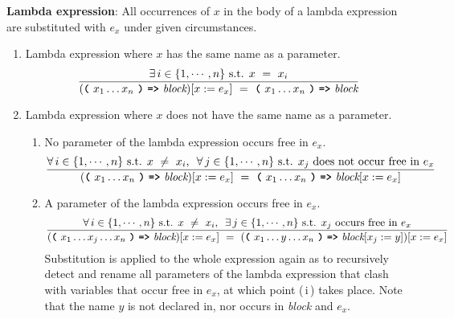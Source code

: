 \vspace{10mm}
\textbf{Lambda expression}: All occurrences of $x$ in the body of a lambda expression are substituted with $e_x$ under given circumstances.
\begin{enumerate}
    \item Lambda expression where $x$ has the same name as a parameter.
    \[
    \frac{
      \exists \, i \in \{1, \cdots, n\} \text{ s.t. } x \ = \ x_i
    }{
      (\textbf{\texttt{(}}\ x_1 \ldots x_n \ \textbf{\texttt{)}}\ \textbf{\texttt{=>}}\ \textit{block})[x := e_x]
      \ = \ 
      \textbf{\texttt{(}}\ x_1 \ldots x_n \ \textbf{\texttt{)}}\ \textbf{\texttt{=>}}\ \textit{block}
    }
    \]
    \item Lambda expression where $x$ does not have the same name as a parameter.
    \begin{enumerate}
        \item No parameter of the lambda expression occurs free in $e_x$.
        \[
        \frac{
          \forall \, i \in \{1, \cdots, n\} \text{ s.t. } x \ \neq \ x_i \text{, } \ \forall \, j \in \{1, \cdots, n\} \text{ s.t. } x_j \text{ does not occur free in $e_x$}
        }{
          (\textbf{\texttt{(}}\ x_1 \ldots x_n \ \textbf{\texttt{)}}\ \textbf{\texttt{=>}}\ \textit{block})[x := e_x]
          \ = \ 
          \textbf{\texttt{(}}\ x_1 \ldots x_n \ \textbf{\texttt{)}}\ \textbf{\texttt{=>}}\ \textit{block}[x := e_x]
        }
        \]
        \item A parameter of the lambda expression occurs free in $e_x$.
        \[
        \frac{
          \forall \, i \in \{1, \cdots, n\} \text{ s.t. } x \ \neq \ x_i \text{, } \ \exists \, j \in \{1, \cdots, n\} \text{ s.t. } x_j \text{ occurs free in $e_x$}
        }{
          (\textbf{\texttt{(}}\ x_1 \ldots x_j \ldots x_n \ \textbf{\texttt{)}}\ \textbf{\texttt{=>}}\ \textit{block})[x := e_x]
          \ = \ 
          (\textbf{\texttt{(}}\ x_1 \ldots y \ldots x_n \ \textbf{\texttt{)}}\ \textbf{\texttt{=>}}\ \textit{block}[x_j := y])[x := e_x]
        }
        \]
        Substitution is applied to the whole expression again as to recursively detect and rename all parameters of the lambda expression that clash with variables that occur free in $e_x$, at which point (\,i\,) takes place. Note that the name $y$ is not declared in, nor occurs in \textit{block} and $e_x$.
        \end{enumerate}
        \end{enumerate}


